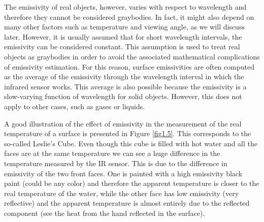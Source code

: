 		\bigskip
		The emissivity of real objects, however, varies with respect to wavelength and therefore they cannot be considered graybodies. In fact, it might also depend on many other factors such as temperature and viewing angle, as we will discuss later. However, it is usually assumed that for short wavelength intervals, the emissivity can be considered constant. This assumption is used to treat real objects as graybodies in order to avoid the associated mathematical complications of emissivity estimation. For this reason, surface emissivities are often computed as the average of the emissivity through the wavelength interval in which the infrared sensor works. This average is also possible because the emissivity is a slow-varying function of wavelength for solid objects. However, this does not apply to other cases, such as gases or liquids.
		
		A good illustration of the effect of emissivity in the measurement of the real temperature of a surface is presented in Figure \ref{fig1.5}. This corresponds to the so-called Leslie’s Cube. Even though this cube is filled with hot water and all the faces are at the same temperature we can see a huge difference in the temperature measured by the IR sensor. This is due to the difference in emissivity of the two front faces. One is painted with a high emissivity black paint (could be any color) and therefore the apparent temperature is closer to the real temperature of the water, while the other face has low emissivity (very reflective) and the apparent temperature is almost entirely due to the reflected component (see the heat from the hand reflected in the surface).
		
